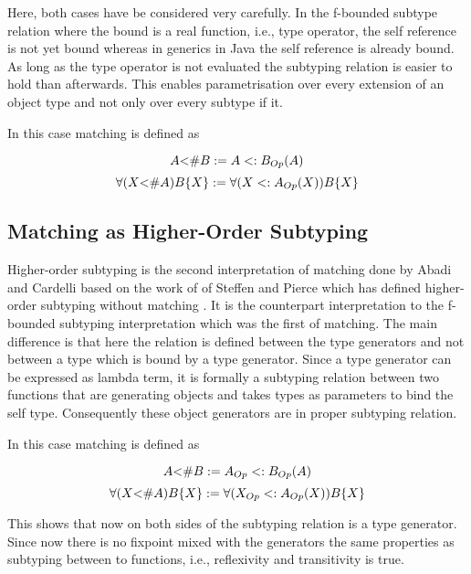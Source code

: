Here, both cases have be considered very carefully. In the f-bounded subtype
relation where the bound is a real function, i.e., type operator,
the self reference is not yet bound whereas in generics in Java the self
reference is already bound. As long as the type operator is not evaluated
the subtyping relation is easier to hold than afterwards. This enables
parametrisation over every extension of an object type and not only over
every subtype if it.

In this case matching is defined as\cite{abadi_subtyping_1996}
\begin{defn}
	\label{def:matchingAsBound}
	\[A \textnormal{<\#} B := A <: B_{Op}(A)\]
	\[\forall (X \textnormal{<\#} A)B\{X\} := \forall (X <: A_{Op}(X))B\{X\}\]
\end{defn}

\subsection{Matching as Higher-Order Subtyping}
Higher-order subtyping is the second interpretation of matching done
by Abadi and Cardelli \cite{abadi_subtyping_1996} based on the work of
of Steffen and Pierce which has defined higher-order subtyping without
matching \cite{steffen_higher-order_1994}. It is the counterpart
interpretation to the f-bounded subtyping interpretation which was
the first of matching. The main difference is that here the relation is
defined between the type generators and not between a type which is bound
by a type generator. Since a type generator can be expressed as lambda
term, it is formally a subtyping relation between two functions that are
generating objects and takes types as parameters to bind the self type.
Consequently these object generators are in proper subtyping relation.

In this case matching is defined as\cite{abadi_subtyping_1996}
\begin{defn}
	\label{def:matchingAsHigherOrder}
	\[A \textnormal{<\#} B := A_{Op} <: B_{Op}(A)\]
	\[\forall (X \textnormal{<\#} A)B\{X\} := \forall (X_{Op} <: A_{Op}(X))B\{X\}\]
\end{defn}

This shows that now on both sides of the subtyping relation is a type
generator. Since now there is no fixpoint mixed with the generators
the same properties as subtyping between to functions, i.e., reflexivity
and transitivity is true.
%


